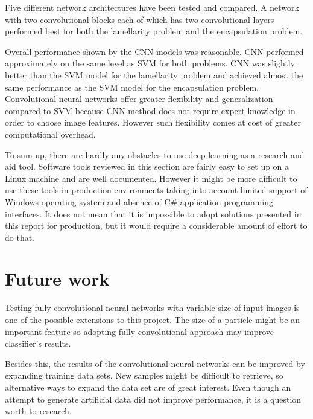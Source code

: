 \documentclass[a4paper, 11pt, table]{article}
\begin{document}
Five different network architectures have been tested and compared. A network with two convolutional blocks each of which has two convolutional layers performed best for both the lamellarity problem and the encapsulation problem. 

Overall performance shown by the CNN models was reasonable. CNN performed approximately on the same level as SVM for both problems. CNN was slightly better than the SVM model for the lamellarity problem and achieved almost the same performance as the SVM model for the encapsulation problem. Convolutional neural networks offer greater flexibility and generalization compared to SVM because CNN method does not require expert knowledge in order to choose image features. However such flexibility comes at cost of greater computational overhead.

To sum up, there are hardly any obstacles to use deep learning as a
research and aid tool. Software tools reviewed in this section are fairly easy
to set up on a Linux machine and are well documented. However it might
be more difficult to use these tools in production environments taking into
account limited support of Windows operating system and absence of C\#
application programming interfaces. It does not mean that it is impossible to
adopt  solutions presented in this report for production, but it would require a
considerable amount of effort to do that.

\section{Future work}
Testing fully convolutional neural networks with variable size of input images is one of the possible extensions to this project. The size of a particle might be an important feature so adopting fully convolutional approach may improve classifier's results.

Besides this, the results of the convolutional neural networks can be improved by expanding training data sets. New samples might be difficult to retrieve, so alternative ways to expand the data set are of great interest. Even though an attempt to generate artificial data did not improve performance, it is a question worth to research.

\newpage
\printbibliography
\end{document}
